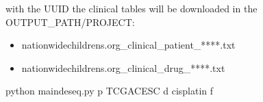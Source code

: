 \documentclass[letterpaper,10pt,english]{sphinxmanual}
\begin{document}
\begin{fulllineitems}
\sphinxAtStartPar
with the UUID the clinical tables will be downloaded in the
OUTPUT\_PATH/PROJECT:
\begin{itemize}
\item {} 
\sphinxAtStartPar
nationwidechildrens.org\_clinical\_patient\_****.txt

\item {} 
\sphinxAtStartPar
nationwidechildrens.org\_clinical\_drug\_****.txt

\end{itemize}

\def\sphinxLiteralBlockLabel{\label{\detokenize{index:function-2}}}
\begin{sphinxVerbatim}[commandchars=\\\{\}]
\PYGZdl{} python main\PYGZus{}deseq.py \PYGZhy{}p TCGA\PYGZhy{}CESC \PYGZhy{}d cisplatin \PYGZhy{}f 
\end{sphinxVerbatim}

\end{fulllineitems}

\end{document}
